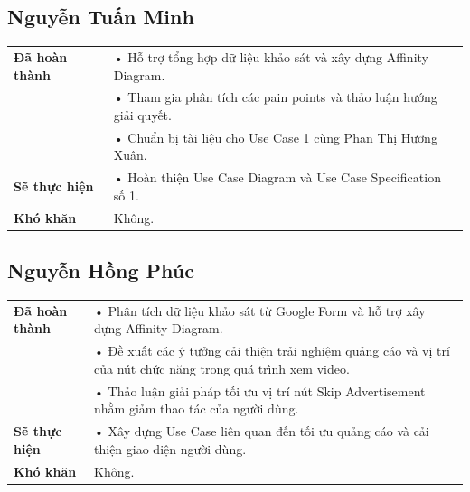 \documentclass[11pt,a4paper]{article}
\begin{document}
\vspace{0.6cm}


\subsection*{Nguyễn Tuấn Minh}

\begin{tabularx}{\textwidth}{|p{4cm}|X|}
\hline
\textbf{Đã hoàn thành} &
• Hỗ trợ tổng hợp dữ liệu khảo sát và xây dựng Affinity Diagram.\\
&
• Tham gia phân tích các pain points và thảo luận hướng giải quyết.\\
&
• Chuẩn bị tài liệu cho Use Case 1 cùng Phan Thị Hương Xuân.\\
\hline

\textbf{Sẽ thực hiện} &
• Hoàn thiện Use Case Diagram và Use Case Specification số 1.\\
\hline

\textbf{Khó khăn} &
Không.\\
\hline
\end{tabularx}

\vspace{0.6cm}


\subsection*{Nguyễn Hồng Phúc}

\begin{tabularx}{\textwidth}{|p{4cm}|X|}
\hline
\textbf{Đã hoàn thành} &
• Phân tích dữ liệu khảo sát từ Google Form và hỗ trợ xây dựng Affinity Diagram.\\
&
• Đề xuất các ý tưởng cải thiện trải nghiệm quảng cáo và vị trí của nút chức năng trong quá trình xem video.\\
&
• Thảo luận giải pháp tối ưu vị trí nút Skip Advertisement nhằm giảm thao tác của người dùng.\\
\hline

\textbf{Sẽ thực hiện} &
• Xây dựng Use Case liên quan đến tối ưu quảng cáo và cải thiện giao diện người dùng.\\
\hline

\textbf{Khó khăn} &
Không.\\
\hline
\end{tabularx}
\end{document}
